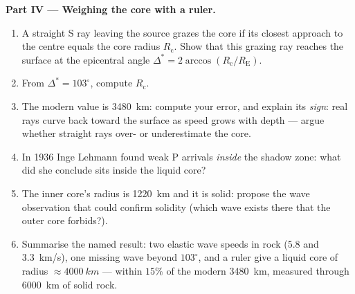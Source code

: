 \begin{problem}
\medskip\noindent\textbf{Part IV --- Weighing the core with a ruler.}
\begin{enumerate}[resume]
  \item A straight S ray leaving the source grazes the core if its
        closest approach to the centre equals the core radius
        $R_{\text{c}}$. Show that this grazing ray reaches the
        surface at the epicentral angle $\Delta^* =
        2\arccos(R_{\text{c}}/R_{\text{E}})$.
  \item From $\Delta^* = 103^\circ$, compute $R_{\text{c}}$.
  \item The modern value is \qty{3480}{km}: compute your error, and
        explain its \emph{sign}: real rays curve back toward the
        surface as speed grows with depth --- argue whether straight
        rays over- or underestimate the core.
  \item In 1936 Inge Lehmann found weak P arrivals \emph{inside} the
        shadow zone: what did she conclude sits inside the liquid
        core?
  \item The inner core's radius is \qty{1220}{km} and it is solid:
        propose the wave observation that could confirm solidity
        (which wave exists there that the outer core forbids?).
  \item Summarise the named result: two elastic wave speeds in rock
        ($5.8$ and \qty{3.3}{km/s}), one missing wave beyond
        $103^\circ$, and a ruler give a liquid core of radius
        $\approx \qty{4000}{km}$ --- within $15\%$ of the modern
        \qty{3480}{km}, measured through \qty{6000}{km} of solid
        rock.
\end{enumerate}
\end{problem}
